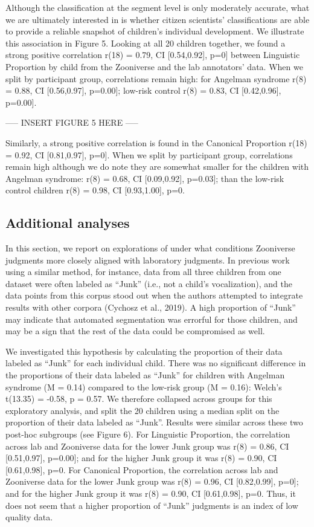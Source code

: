 \documentclass[english,,man]{apa6}
\begin{document}
Although the classification at the segment level is only moderately accurate, what we are ultimately interested in is whether citizen scientists' classifications are able to provide a reliable snapshot of children's individual development. We illustrate this association in Figure 5. Looking at all 20 children together, we found a strong positive correlation r(18) = 0.79, CI {[}0.54,0.92{]}, p=0{]} between Linguistic Proportion by child from the Zooniverse and the lab annotators' data. When we split by participant group, correlations remain high: for Angelman syndrome r(8) = 0.88, CI {[}0.56,0.97{]}, p=0.00{]}; low-risk control r(8) = 0.83, CI {[}0.42,0.96{]}, p=0.00{]}.

----- INSERT FIGURE 5 HERE -----

Similarly, a strong positive correlation is found in the Canonical Proportion r(18) = 0.92, CI {[}0.81,0.97{]}, p=0{]}. When we split by participant group, correlations remain high although we do note they are somewhat smaller for the children with Angelman syndrome: r(8) = 0.68, CI {[}0.09,0.92{]}, p=0.03{]}; than the low-risk control children r(8) = 0.98, CI {[}0.93,1.00{]}, p=0.

\hypertarget{additional-analyses}{%
\subsection{Additional analyses}\label{additional-analyses}}

In this section, we report on explorations of under what conditions Zooniverse judgments more closely aligned with laboratory judgments. In previous work using a similar method, for instance, data from all three children from one dataset were often labeled as \enquote{Junk} (i.e., not a child's vocalization), and the data points from this corpus stood out when the authors attempted to integrate results with other corpora (Cychosz et al., 2019). A high proportion of \enquote{Junk} may indicate that automated segmentation was errorful for those children, and may be a sign that the rest of the data could be compromised as well.

We investigated this hypothesis by calculating the proportion of their data labeled as \enquote{Junk} for each individual child. There was no significant difference in the proportions of their data labeled as \enquote{Junk} for children with Angelman syndrome (M = 0.14) compared to the low-risk group (M = 0.16): Welch's t(13.35) = -0.58, p = 0.57. We therefore collapsed across groups for this exploratory analysis, and split the 20 children using a median split on the proportion of their data labeled as \enquote{Junk}. Results were similar across these two post-hoc subgroups (see Figure 6). For Linguistic Proportion, the correlation across lab and Zooniverse data for the lower Junk group was r(8) = 0.86, CI {[}0.51,0.97{]}, p=0.00{]}; and for the higher Junk group it was r(8) = 0.90, CI {[}0.61,0.98{]}, p=0. For Canonical Proportion, the correlation across lab and Zooniverse data for the lower Junk group was r(8) = 0.96, CI {[}0.82,0.99{]}, p=0{]}; and for the higher Junk group it was r(8) = 0.90, CI {[}0.61,0.98{]}, p=0. Thus, it does not seem that a higher proportion of \enquote{Junk} judgments is an index of low quality data.
\end{document}
